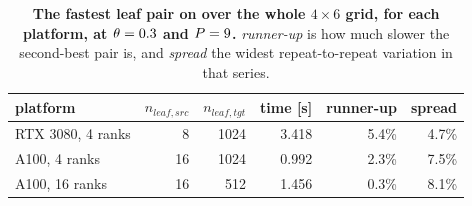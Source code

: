 \begin{table}[!htb]
\centering
\footnotesize
\caption[Leaf optimum by platform]{\textbf{The fastest leaf pair on
    \platMoleculeplatformshiftvyb{} over the whole $4 \times 6$ grid, for each platform, at
    $\theta = 0.3{}$ and $P = 9{}$.} \emph{runner-up} is how much
    slower the second-best pair is, and \emph{spread} the widest
    repeat-to-repeat variation in that series.\platMachineplatformshiftvyb}
\label{tab:platform_shift_6vyb}
\begin{tabular}{lrrrrr}
\toprule
platform & $n_{leaf,src}$ & $n_{leaf,tgt}$ & time [s] & runner-up & spread \\
\midrule
RTX 3080, 4 ranks & 8 & 1024 & 3.418 & 5.4\% & 4.7\% \\
A100, 4 ranks & 16 & 1024 & 0.992 & 2.3\% & 7.5\% \\
A100, 16 ranks & 16 & 512 & 1.456 & 0.3\% & 8.1\% \\

\bottomrule
\end{tabular}
\end{table}
